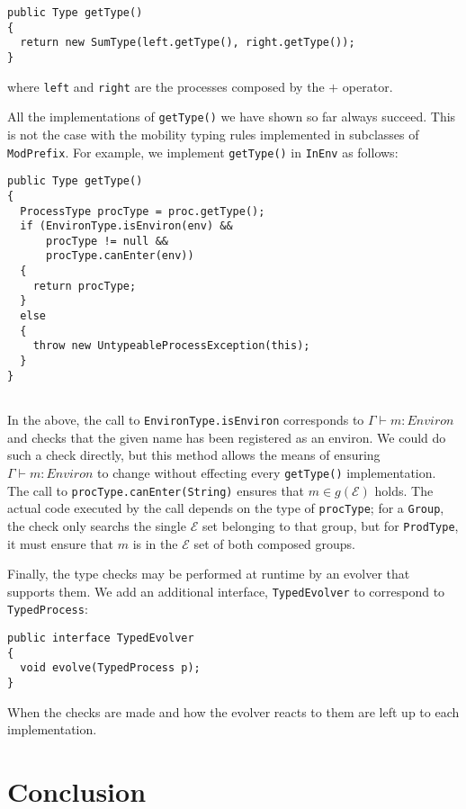 \begin{verbatim}
public Type getType()
{
  return new SumType(left.getType(), right.getType());
}
\end{verbatim}

\noindent where \texttt{left} and \texttt{right} are the processes
composed by the $+$ operator.

All the implementations of \texttt{getType()} we have shown so far
always succeed.  This is not the case with the mobility typing rules
implemented in subclasses of \texttt{ModPrefix}.  For example, we
implement \texttt{getType()} in \texttt{InEnv} as follows:

\begin{verbatim}
public Type getType()
{
  ProcessType procType = proc.getType();  
  if (EnvironType.isEnviron(env) &&
      procType != null &&
      procType.canEnter(env))
  {
    return procType;
  }
  else
  {
    throw new UntypeableProcessException(this);
  }
}
 
\end{verbatim}

\noindent In the above, the call to \texttt{EnvironType.isEnviron}
corresponds to $\Gamma \vdash m : Environ$ and checks that the given
name has been registered as an environ.  We could do such a check
directly, but this method allows the means of ensuring $\Gamma \vdash
m : Environ$ to change without effecting every \texttt{getType()}
implementation.  The call to \texttt{procType.canEnter(String)}
ensures that $m \in g(\mathscr{E})$ holds.  The actual code executed
by the call depends on the type of \texttt{procType}; for a
\texttt{Group}, the check only searchs the single $\mathcal{E}$ set
belonging to that group, but for \texttt{ProdType}, it must ensure
that $m$ is in the $\mathcal{E}$ set of both composed groups.

Finally, the type checks may be performed at runtime by an evolver
that supports them.  We add an additional interface,
\texttt{TypedEvolver} to correspond to \texttt{TypedProcess}:

\begin{verbatim}
public interface TypedEvolver
{
  void evolve(TypedProcess p);
}
\end{verbatim}

\noindent When the checks are made and how the evolver reacts to them
are left up to each implementation.

\section{Conclusion}

